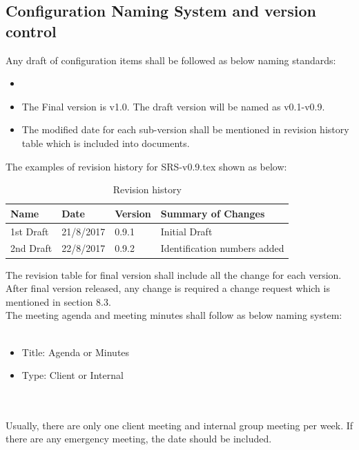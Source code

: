\subsection{Configuration Naming System and version control}
Any draft of configuration items shall be followed as below naming standards:
\begin{itemize}
\item \texttt{}\\
      \texttt{}
\item The Final version is v1.0. The draft version will be named as v0.1-v0.9.
\item The modified date for each sub-version shall be mentioned in revision history table which is included into documents.\\
\end{itemize}

The examples of revision history for SRS-v0.9.tex shown as below:\\

\begin{table}[]
	\centering
	\caption{Revision history}
	\label{my-label}
	\begin{tabular}{|l|l|l|l|}
		\hline
		Name      & Date      & Version & Summary of Changes           \\ \hline
		1st Draft & 21/8/2017 & 0.9.1   & Initial Draft                \\ \hline
		2nd Draft & 22/8/2017 & 0.9.2   & Identification numbers added \\ \hline
	\end{tabular}
\end{table}


The revision table for final version shall include all the change for each version. After final version released, any change is required a change request which is mentioned in section 8.3.\\


The meeting agenda and meeting minutes shall follow as below naming system:\\
\texttt{}\\
\begin{itemize}
\item Title: Agenda or Minutes
\item Type: Client or Internal
\end{itemize}
\texttt{} \\\\
Usually, there are only one client meeting and internal group meeting per week. If there are any emergency meeting, the date should be included.\\\\
\texttt{}\\
\texttt{}\\
